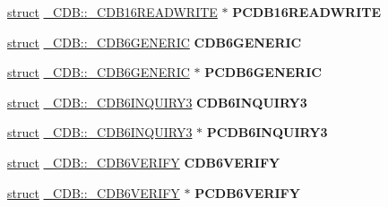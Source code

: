 \begin{DoxyCompactItemize}
\item 
\mbox{\label{union___c_d_b_ab68e333d0899bdd8fc5c4122939c35e2}} 
\hyperlink{interfacestruct}{struct} \hyperlink{struct___c_d_b_1_1___c_d_b16_r_e_a_d_w_r_i_t_e}{\+\_\+\+C\+D\+B\+::\+\_\+\+C\+D\+B16\+R\+E\+A\+D\+W\+R\+I\+TE} $\ast$ {\bfseries P\+C\+D\+B16\+R\+E\+A\+D\+W\+R\+I\+TE}
\item 
\mbox{\label{union___c_d_b_a1c2e5baffc626b408ed0b9caf80c26a6}} 
\hyperlink{interfacestruct}{struct} \hyperlink{struct___c_d_b_1_1___c_d_b6_g_e_n_e_r_i_c}{\+\_\+\+C\+D\+B\+::\+\_\+\+C\+D\+B6\+G\+E\+N\+E\+R\+IC} {\bfseries C\+D\+B6\+G\+E\+N\+E\+R\+IC}
\item 
\mbox{\label{union___c_d_b_a937fba493e026c7b28279ad6d552d7c0}} 
\hyperlink{interfacestruct}{struct} \hyperlink{struct___c_d_b_1_1___c_d_b6_g_e_n_e_r_i_c}{\+\_\+\+C\+D\+B\+::\+\_\+\+C\+D\+B6\+G\+E\+N\+E\+R\+IC} $\ast$ {\bfseries P\+C\+D\+B6\+G\+E\+N\+E\+R\+IC}
\item 
\mbox{\label{union___c_d_b_a25d5b405c0caa70e90e9a95aa301a31f}} 
\hyperlink{interfacestruct}{struct} \hyperlink{struct___c_d_b_1_1___c_d_b6_i_n_q_u_i_r_y3}{\+\_\+\+C\+D\+B\+::\+\_\+\+C\+D\+B6\+I\+N\+Q\+U\+I\+R\+Y3} {\bfseries C\+D\+B6\+I\+N\+Q\+U\+I\+R\+Y3}
\item 
\mbox{\label{union___c_d_b_a94a5e9ebf890f3ee80fd7eb813a5c4f7}} 
\hyperlink{interfacestruct}{struct} \hyperlink{struct___c_d_b_1_1___c_d_b6_i_n_q_u_i_r_y3}{\+\_\+\+C\+D\+B\+::\+\_\+\+C\+D\+B6\+I\+N\+Q\+U\+I\+R\+Y3} $\ast$ {\bfseries P\+C\+D\+B6\+I\+N\+Q\+U\+I\+R\+Y3}
\item 
\mbox{\label{union___c_d_b_a2878eb345eb35ae84a304276909812ea}} 
\hyperlink{interfacestruct}{struct} \hyperlink{struct___c_d_b_1_1___c_d_b6_v_e_r_i_f_y}{\+\_\+\+C\+D\+B\+::\+\_\+\+C\+D\+B6\+V\+E\+R\+I\+FY} {\bfseries C\+D\+B6\+V\+E\+R\+I\+FY}
\item 
\mbox{\label{union___c_d_b_a2fc2d91033e288d15edca69bf5834fe5}} 
\hyperlink{interfacestruct}{struct} \hyperlink{struct___c_d_b_1_1___c_d_b6_v_e_r_i_f_y}{\+\_\+\+C\+D\+B\+::\+\_\+\+C\+D\+B6\+V\+E\+R\+I\+FY} $\ast$ {\bfseries P\+C\+D\+B6\+V\+E\+R\+I\+FY}
\item 

\end{DoxyCompactItemize}

